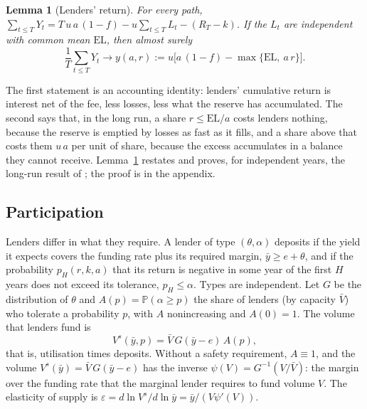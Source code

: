\documentclass[preprint,11pt,authoryear]{elsarticle}
\newtheorem{lemma}{Lemma}
\theoremstyle{definition}
\newcommand{\EL}{\mathrm{EL}}
\newcommand{\Prob}{\mathbb{P}}
\begin{document}
\begin{lemma}[Lenders' return]\label{lem:return}
For every path, $\sum_{t\le T}Y_t=T\,u\,a\,(1-f)-u\sum_{t\le T}L_t-(R_T-k)$. If the $L_t$ are independent
with common mean $\EL$, then almost surely
\begin{equation}\label{eq:longrun}
  \frac1T\sum_{t\le T}Y_t\longrightarrow y(a,r):=u\bigl[a\,(1-f)-\max\{\EL,\ a\,r\}\bigr].
\end{equation}
\end{lemma}

The first statement is an accounting identity: lenders' cumulative return is interest net of the fee,
less losses, less what the reserve has accumulated. The second says that, in the long run, a share
$r\le\EL/a$ costs lenders nothing, because the reserve is emptied by losses as fast as it fills, and a
share above that costs them $u\,a$ per unit of share, because the excess accumulates in a balance
they cannot receive. Lemma~\ref{lem:return} restates and proves, for independent years, the
long-run result of \citet{pricingreserve2026}; the proof is in the appendix.

\subsection{Participation}

Lenders differ in what they require. A lender of type $(\theta,\alpha)$ deposits if the yield it
expects covers the funding rate plus its required margin, $\bar y\ge e+\theta$, and if the probability
$p_H(r,k,a)$ that its return is negative in some year of the first $H$ years does not exceed its
tolerance, $p_H\le\alpha$. Types are independent. Let $G$ be the distribution of $\theta$ and
$A(p)=\Prob(\alpha\ge p)$ the share of lenders (by capacity $\bar V$) who tolerate a probability $p$,
with $A$ nonincreasing and $A(0)=1$. The volume that lenders fund is
\begin{equation}\label{eq:supply}
  V^s(\bar y,p)=\bar V\,G(\bar y-e)\,A(p),
\end{equation}
that is, utilisation times deposits. Without a safety requirement, $A\equiv1$, and the volume
$V^s(\bar y)=\bar V\,G(\bar y-e)$ has the inverse $\psi(V)=G^{-1}(V/\bar V)$: the margin over the funding rate
that the marginal lender requires to fund volume $V$. The elasticity of supply is
$\varepsilon=d\ln V^s/d\ln \bar y=\bar y/(V\psi'(V))$.
\end{document}
